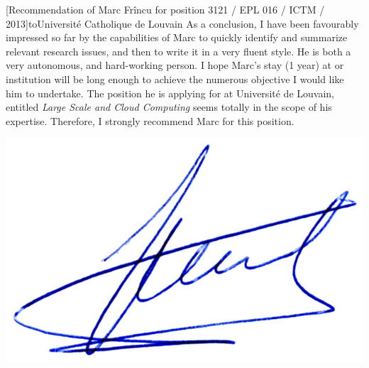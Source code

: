 \documentclass[a4paper,10pt]{article}
\begin{document}
\begin{letter}[Recommendation of Marc Fr\^incu for position 3121 / EPL 016 / ICTM / 2013]{to}{Universit\'e Catholique de Louvain}
As a conclusion, I have been favourably  impressed so far by the capabilities of
Marc to  quickly identify and  summarize relevant  research issues, and  then to
write it in a very fluent style.  He is both a very autonomous, and hard-working
person.  I hope  Marc's stay (1 year)  at or institution will be  long enough to
achieve the numerous  objective I would like him to  undertake.  The position he
is applying  for at  Universit\'e de Louvain,  entitled \textit{Large  Scale and
  Cloud Computing}  seems totally in the  scope of his expertise.   Therefore, I
strongly recommend Marc for this position.


\end{letter}
\begin{flushright}
\includegraphics[width=.30\textwidth]{signgenaud.jpg}
\end{flushright}
%
%
\end{document}
